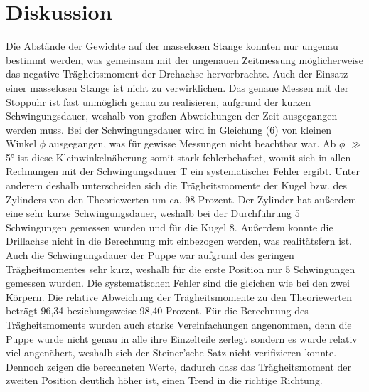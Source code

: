 \section{Diskussion}
\label{sec:Diskussion}

Die Abstände der Gewichte auf der masselosen Stange konnten nur
ungenau bestimmt werden, was gemeinsam mit der ungenauen Zeitmessung möglicherweise das negative Trägheitsmoment
der Drehachse hervorbrachte. Auch der Einsatz einer masselosen Stange ist nicht
zu verwirklichen.
Das genaue Messen mit der Stoppuhr ist fast unmöglich genau zu realisieren, aufgrund der 
kurzen Schwingungsdauer, weshalb von großen Abweichungen der Zeit ausgegangen werden muss.
Bei der Schwingungsdauer wird in Gleichung (6) von kleinen Winkel $\phi$ ausgegangen, was für gewisse Messungen
nicht beachtbar war. Ab $\phi$ \(\gg\) 5° ist diese
Kleinwinkelnäherung somit stark fehlerbehaftet, womit sich in allen Rechnungen mit der Schwingungsdauer
T ein systematischer Fehler ergibt. Unter anderem deshalb unterscheiden sich
die Trägheitsmomente der Kugel bzw. des Zylinders von den Theoriewerten um
ca. 98 Prozent. Der Zylinder hat außerdem eine sehr kurze Schwingungsdauer,
weshalb bei der Durchführung 5 Schwingungen gemessen wurden und für die Kugel 8.
Außerdem konnte die Drillachse nicht in die Berechnung mit einbezogen werden, was realitätsfern ist.
Auch die Schwingungsdauer der Puppe war aufgrund des geringen Trägheitmomentes sehr kurz, weshalb 
für die erste Position nur 5 Schwingungen gemessen wurden.
Die systematischen Fehler sind die gleichen wie bei den zwei Körpern.
Die relative Abweichung der Trägheitsmomente zu den Theoriewerten beträgt 96,34 beziehungsweise 98,40 Prozent. 
Für die Berechnung des Trägheitsmoments wurden auch starke Vereinfachungen angenommen,
denn die Puppe wurde nicht genau in alle ihre Einzelteile zerlegt sondern es wurde relativ viel angenähert,
weshalb sich der Steiner'sche Satz nicht verifizieren konnte. Dennoch zeigen die berechneten Werte, dadurch
dass das Trägheitsmoment der zweiten Position deutlich höher ist, einen Trend in die richtige Richtung.